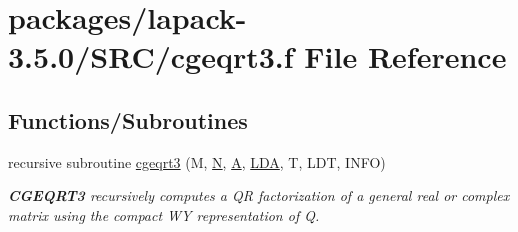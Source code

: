 \hypertarget{cgeqrt3_8f}{}\section{packages/lapack-\/3.5.0/\+S\+R\+C/cgeqrt3.f File Reference}
\label{cgeqrt3_8f}
\subsection*{Functions/\+Subroutines}
\begin{DoxyCompactItemize}
\item 
recursive subroutine \hyperlink{group__complexGEcomputational_ga3ce7c8f1eb723ddba558d46a3e518635}{cgeqrt3} (M, \hyperlink{polmisc_8c_a0240ac851181b84ac374872dc5434ee4}{N}, \hyperlink{classA}{A}, \hyperlink{example__user_8c_ae946da542ce0db94dced19b2ecefd1aa}{L\+D\+A}, T, L\+D\+T, I\+N\+F\+O)
\begin{DoxyCompactList}\small\item\em {\bfseries C\+G\+E\+Q\+R\+T3} recursively computes a Q\+R factorization of a general real or complex matrix using the compact W\+Y representation of Q. \end{DoxyCompactList}\end{DoxyCompactItemize}
